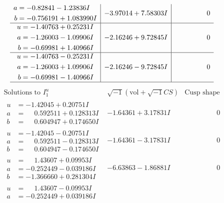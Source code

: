 \documentclass[1p]{elsarticle_modified}
\theoremstyle{definition}
\newcommand{\I}{\sqrt{-1}}
\begin{document}
$$\begin{array}{c|c|c}
\begin{aligned}
a &= -0.82841 - 1.23836 I \\
b &= -0.756191 + 1.083990 I\end{aligned}
 & -3.97014 + 7.58303 I & \phantom{-0.000000 } 0 \\ \hline\begin{aligned}
u &= -1.40763 + 0.25231 I \\
a &= -1.26003 - 1.09906 I \\
b &= -0.69981 + 1.40966 I\end{aligned}
 & -2.16246 + 9.72845 I & \phantom{-0.000000 } 0 \\ \hline\begin{aligned}
u &= -1.40763 - 0.25231 I \\
a &= -1.26003 + 1.09906 I \\
b &= -0.69981 - 1.40966 I\end{aligned}
 & -2.16246 - 9.72845 I & \phantom{-0.000000 } 0\\
 \hline 
 \end{array}$$\newpage$$\begin{array}{c|c|c}  
\text{Solutions to }I^u_{1}& \I (\text{vol} + \sqrt{-1}CS) & \text{Cusp shape}\\
 \hline 
\begin{aligned}
u &= -1.42045 + 0.20751 I \\
a &= \phantom{-}0.592511 + 0.128313 I \\
b &= \phantom{-}0.604947 + 0.174650 I\end{aligned}
 & -1.64361 + 3.17831 I & \phantom{-0.000000 } 0 \\ \hline\begin{aligned}
u &= -1.42045 - 0.20751 I \\
a &= \phantom{-}0.592511 - 0.128313 I \\
b &= \phantom{-}0.604947 - 0.174650 I\end{aligned}
 & -1.64361 - 3.17831 I & \phantom{-0.000000 } 0 \\ \hline\begin{aligned}
u &= \phantom{-}1.43607 + 0.09953 I \\
a &= -0.252449 - 0.039186 I \\
b &= -1.366660 + 0.281304 I\end{aligned}
 & -6.63863 - 1.86881 I & \phantom{-0.000000 } 0 \\ \hline\begin{aligned}
u &= \phantom{-}1.43607 - 0.09953 I \\
a &= -0.252449 + 0.039186 I \\

\end{aligned}
\end{array}$$
\end{document}

